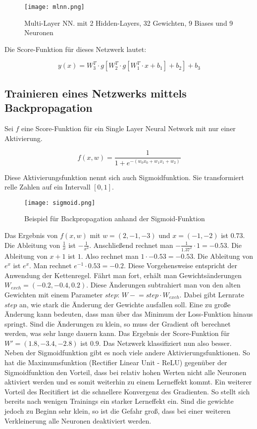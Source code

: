 \documentclass[11pt,fleqn]{book}
\newcommand{\minuseq}{\mathrel{-}=}
\begin{document}
\begin{figure}[h]
\centering
\texttt{[image: mlnn.png]}
\caption{Multi-Layer NN. mit 2 Hidden-Layers, 32 Gewichten, 9 Biases und 9 Neuronen}
\end{figure}

Die Score-Funktion für dieses Netzwerk lautet:

\[y(x) = W_3^T \cdot g[W_2^T \cdot g[W_1^T \cdot x+b_1]+b_2]+b_3\]


\subsection{Trainieren eines Netzwerks mittels Backpropagation}
Sei $f$ eine Score-Funktion für ein Single Layer Neural Network mit nur einer Aktivierung.

\[f(x,w) = \frac{1}{1+e^{-(w_0x_0+w_1x_1+w_2)}}\]

Diese Aktivierungsfunktion nennt sich auch Sigmoidfunktion. Sie transformiert relle Zahlen auf ein Intervall $\left[0, 1\right]$.

\begin{figure}[h]
\centering
\texttt{[image: sigmoid.png]}
\caption{Beispiel für Backpropagation anhand der Sigmoid-Funktion}
\end{figure}

Das Ergebnis von $f(x,w)$ mit $w = (2,-1,-3)$ und $x = (-1,-2)$ ist $0.73$. Die Ableitung von  $\frac{1}{x}$ ist $-\frac{1}{x^2}$. Anschließend rechnet man $-\frac{1}{1.37^2}\cdot 1 = -0.53$. Die Ableitung von $x+1$ ist $1$. Also rechnet man $1\cdot -0.53=-0.53$. Die Ableitung von $e^x$ ist $e^x$. Man rechnet $e^{-1}\cdot 0.53=-0.2$. Diese Vorgehensweise entspricht der Anwendung der Kettenregel. Fährt man fort, erhält man Gewichtsänderungen $W_{exch}=(-0.2,-0.4,0.2)$. Diese Änderungen subtrahiert man von den alten Gewichten mit einem Parameter $step$: $W \minuseq step \cdot W_{exch}$. Dabei gibt Lernrate $step$ an, wie stark die Änderung der Gewichte ausfallen soll. Eine zu große Änderung kann bedeuten, dass man über das Minimum der Loss-Funktion hinaus springt. Sind die Änderungen zu klein, so muss der Gradient oft berechnet werden, was sehr lange dauern kann. Das Ergebnis der Score-Funktion für $W' = (1.8,-3.4,-2.8)$ ist $0.9$. Das Netzwerk klassifiziert nun also besser.\\
\bigskip
Neben der Sigmoidfunktion gibt es noch viele andere Aktivierungsfunktionen. So hat die Maximumsfunktion (Rectifier Linear Unit - ReLU) gegenüber der Sigmoidfunktion den Vorteil, dass bei relativ hohen Werten nicht alle Neuronen aktiviert werden und es somit weiterhin zu einem Lerneffekt kommt. Ein weiterer Vorteil des Recitifiert ist die schnellere Konvergenz des Gradienten. So stellt sich bereits nach wenigen Trainings ein starker Lerneffekt ein. Sind die gewichte jedoch zu Beginn sehr klein, so ist die Gefahr groß, dass bei einer weiteren Verkleinerung alle Neuronen deaktiviert werden.
\end{document}
